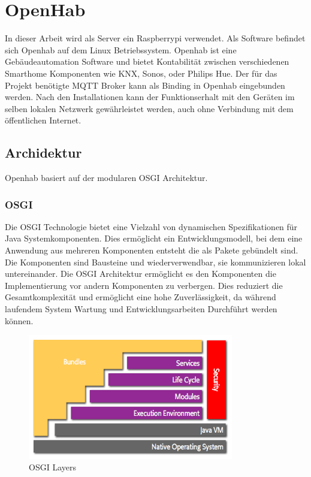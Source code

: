 \section{OpenHab}
In dieser Arbeit wird als Server ein Raspberrypi verwendet. Als Software befindet sich Openhab auf dem Linux Betriebssystem. Openhab ist eine Gebäudeautomation Software und bietet Kontabilität zwischen verschiedenen Smarthome Komponenten wie KNX, Sonos, oder Philips Hue. Der für das Projekt benötigte MQTT Broker kann als Binding in Openhab eingebunden werden. Nach den Installationen kann der Funktionserhalt mit den Geräten im selben lokalen Netzwerk gewährleistet werden, auch ohne Verbindung mit dem öffentlichen Internet.
\subsection{Archidektur}
Openhab basiert auf der modularen OSGI Architektur.
\subsubsection{OSGI}
Die OSGI Technologie bietet eine Vielzahl  von dynamischen Spezifikationen für Java Systemkomponenten. Dies ermöglicht ein Entwicklungsmodell, bei dem eine Anwendung aus  mehreren Komponenten entsteht die als Pakete gebündelt sind. Die Komponenten sind Bausteine und wiederverwendbar, sie kommunizieren lokal untereinander. Die OSGI Architektur ermöglicht es den Komponenten die Implementierung vor andern Komponenten zu verbergen. Dies reduziert die Gesamtkomplexität und ermöglicht eine hohe Zuverlässigkeit, da während laufendem System Wartung und Entwicklungsarbeiten Durchführt werden können.  


 \begin{figure}[H]
	\centering
	\includegraphics[width=0.8\textwidth]{graphics/OSGI.png}
	\caption{OSGI Layers \cite{noauthor_osgi_nodate} }	
	\label{pic: OSGILayers}
\end{figure} 

